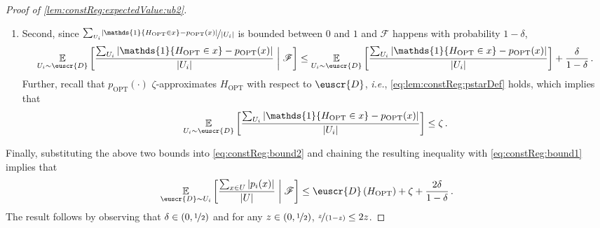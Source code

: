 \documentclass[11pt]{article}
\theoremstyle{plain}
\theoremstyle{definition}
\theoremstyle{remark}
\def\abs#1{\left| #1 \right|}
\newcommand{\given}{\;\middle|\;}
\newcommand{\sinbrace}[1]{\{#1\}}
\newcommand{\inparen}[1]{\left(#1\right)}
\newcommand{\insquare}[1]{\left[#1\right]}
\newcommand{\evF}{\ensuremath{\mathscr{F}}}
\newcommand{\E}{\operatornamewithlimits{\mathbb{E}}}
\newcommand{\Ex}{\E}
\newcommand{\nfrac}[2]{\nicefrac{#1}{#2}}
\newcommand{\opt}{\ensuremath{\mathrm{OPT}}}
\newcommand{\customcal}[1]{\euscr{#1}}
\newcommand{\cD}{\customcal{D}}
\newcommand{\ie}{\textit{i.e.}}
\newcommand{\cDgiven}{\cD}
\begin{document}
\begin{proof}[Proof of \cref{lem:constReg:expectedValue:ub2}]
\begin{enumerate}
\[{{                        }{\abs{U_i}}
                    \given \evF}
                    \leq 
                    \Ex_{U_i\sim \cDgiven}\insquare{
                        \frac{
                            \sum_{U_i}\mathds{1}\sinbrace{H_{\opt}\in x} 
                        }{\abs{U_i}}} + \frac{\delta}{1-\delta}
                    =\cDgiven\inparen{H_{\opt}} + \frac{\delta}{1-\delta}\,.
                \]
                \item Second, since $\nfrac{\sum_{U_i}\abs{\mathds{1}\sinbrace{H_{\opt}\in x} - p_{\opt}(x)}}{\abs{U_i}}$ is bounded between $0$ and $1$ and $\evF$ happens with probability $1-\delta$, 
                \[
                    \Ex_{U_i\sim \cDgiven}\insquare{
                        \frac{
                            \sum_{U_i}\abs{\mathds{1}\sinbrace{H_{\opt}\in x} - p_{\opt}(x)}
                        }{\abs{U_i}}
                    \given \evF}
                    \leq 
                    \Ex_{U_i\sim \cDgiven}\insquare{
                        \frac{
                            \sum_{U_i}\abs{\mathds{1}\sinbrace{H_{\opt}\in x} - p_{\opt}(x)}
                        }{\abs{U_i}}} + \frac{\delta}{1-\delta}\,.
                \]
                Further, recall that $p_{\opt}(\cdot)$ $\zeta$-approximates $H_{\opt}$ with respect to $\cDgiven$, \ie{}, \cref{eq:lem:constReg:pstarDef} holds, which implies that
                \[
                    \Ex_{U_i\sim \cDgiven}\insquare{
                        \frac{
                            \sum_{U_i}\abs{\mathds{1}\sinbrace{H_{\opt}\in x} - p_{\opt}(x)}
                        }{\abs{U_i}}}
                    \leq 
                    \zeta\,.
                \]
            \end{enumerate}
            Finally, substituting the above two bounds into \cref{eq:constReg:bound2} and chaining the resulting inequality with  \cref{eq:constReg:bound1} implies that 
            \[
                \Ex_{\cDgiven\sim U_i}\insquare{ \frac{\sum_{x\in U} \abs{p_i(x)} }{\abs{U}} 
                    \given \evF
                }
                \leq
                \cDgiven\inparen{H_{\opt}}
                +\zeta
                +\frac{2\delta}{1-\delta}\,.
            \]
            The result follows by observing that $\delta\in (0,\nfrac{1}{2})$ and for any $z\in (0,\nfrac{1}{2})$, $\nfrac{z}{(1-z)}\leq 2z$.
        \end{proof}


        
    
        
        
\end{document}
